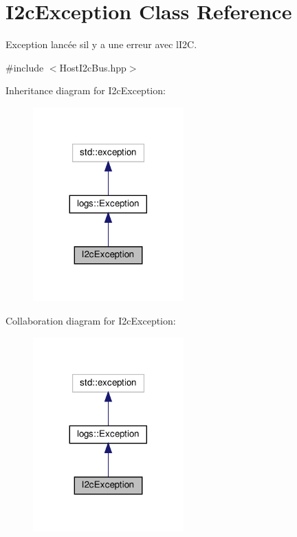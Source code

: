 \hypertarget{classI2cException}{}\section{I2c\+Exception Class Reference}
\label{classI2cException}


Exception lancée s\textquotesingle{}il y a une erreur avec l\textquotesingle{}I2C.  




{\ttfamily \#include $<$Host\+I2c\+Bus.\+hpp$>$}



Inheritance diagram for I2c\+Exception\+:
\nopagebreak
\begin{figure}[H]
\begin{center}
\leavevmode
\includegraphics[width=164pt]{classI2cException__inherit__graph}
\end{center}
\end{figure}


Collaboration diagram for I2c\+Exception\+:
\nopagebreak
\begin{figure}[H]
\begin{center}
\leavevmode
\includegraphics[width=164pt]{classI2cException__coll__graph}
\end{center}
\end{figure}
